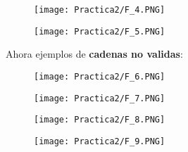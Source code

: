 \documentclass[12pt]{article}
\begin{document}
	\begin{figure}[H]
	        \centering
	        \texttt{[image: Practica2/F\_4.PNG]}
	\end{figure}

	\begin{figure}[H]
	        \centering
	        \texttt{[image: Practica2/F\_5.PNG]}
	\end{figure}

	Ahora ejemplos de \textbf{cadenas no validas}:
	\begin{figure}[H]
	        \centering
	        \texttt{[image: Practica2/F\_6.PNG]}
	\end{figure}

	\begin{figure}[H]
	        \centering
	        \texttt{[image: Practica2/F\_7.PNG]}
	\end{figure}

	\begin{figure}[H]
	        \centering
	        \texttt{[image: Practica2/F\_8.PNG]}
	\end{figure}

	\begin{figure}[H]
	        \centering
	        \texttt{[image: Practica2/F\_9.PNG]}
	\end{figure}
\end{document}
